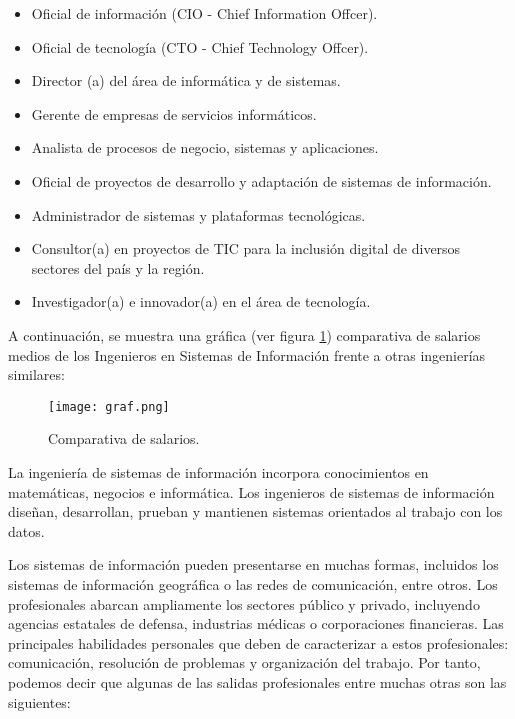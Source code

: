 \documentclass[a4paper,11pt]{scrartcl}
\begin{document}
              
\begin{itemize}
\item Oficial de información (CIO - Chief Information Offcer).
\item               Oficial de tecnología (CTO - Chief Technology Offcer).
\item               Director (a) del área de informática y de sistemas.
\item               Gerente de empresas de servicios informáticos.
\item               Analista de procesos de negocio, sistemas y aplicaciones.
\item               Oficial de proyectos de desarrollo y adaptación de sistemas de información.
\item               Administrador de sistemas y plataformas tecnológicas.
\item               Consultor(a) en proyectos de TIC para la inclusión digital de diversos sectores del país y la región.
\item               Investigador(a) e innovador(a) en el área de tecnología.
\end{itemize}

A continuación, se muestra una gráfica (ver figura \ref{comp}) comparativa de salarios medios de los Ingenieros en Sistemas de Información frente a otras ingenierías similares: 

\begin{figure}[h]
    \centering
    \texttt{[image: graf.png]}
    \caption{Comparativa de salarios.}
    \label{comp}
\end{figure}

La ingeniería de sistemas de información incorpora conocimientos en matemáticas, negocios e informática. Los ingenieros de sistemas de información diseñan, desarrollan, prueban y mantienen sistemas orientados al trabajo con los datos. 

Los sistemas de información pueden presentarse en muchas formas, incluidos los sistemas de información geográfica o las redes de comunicación, entre otros. Los profesionales abarcan ampliamente los sectores público y privado, incluyendo agencias estatales de defensa, industrias médicas o corporaciones financieras.
Las principales habilidades personales que deben de caracterizar a estos profesionales: comunicación, resolución de problemas y organización del trabajo. 
Por tanto, podemos decir que algunas de las salidas profesionales entre muchas otras son las siguientes:
\end{document}
